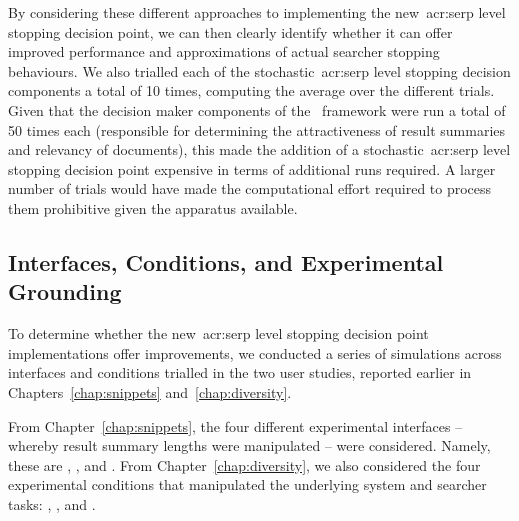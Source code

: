 By considering these different approaches to implementing the new~\gls{acr:serp} level stopping decision point, we can then clearly identify whether it can offer improved performance and approximations of actual searcher stopping behaviours. We also trialled each of the stochastic~\gls{acr:serp} level stopping decision components a total of 10 times, computing the average over the different trials. Given that the decision maker components of the \simiir~framework were run a total of 50 times each (responsible for determining the attractiveness of result summaries and relevancy of documents), this made the addition of a stochastic~\gls{acr:serp} level stopping decision point expensive in terms of additional runs required. A larger number of trials would have made the computational effort required to process them prohibitive given the apparatus available.

\subsection{Interfaces, Conditions, and Experimental Grounding}\label{sec:serp:method:probscosts}
To determine whether the new~\gls{acr:serp} level stopping decision point implementations offer improvements, we conducted a series of simulations across interfaces and conditions trialled in the two user studies, reported earlier in Chapters~\ref{chap:snippets} and~\ref{chap:diversity}.

From Chapter~\ref{chap:snippets}, the four different experimental interfaces -- whereby result summary lengths were manipulated -- were considered. Namely, these are , ,  and . From Chapter~\ref{chap:diversity}, we also considered the four experimental conditions that manipulated the underlying system and searcher tasks: , ,  and .

